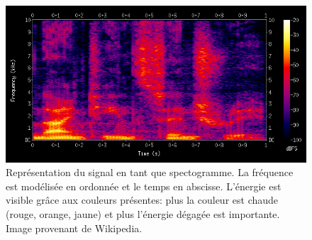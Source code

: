 \begin{figure}[h]
  \centering
  \includegraphics[width=12cm]{./Chapitre3/figures/spectrogramme.png}
  \caption{Représentation du signal en tant que spectogramme. La fréquence est modélisée en ordonnée et le temps en abscisse. L'énergie est visible grâce aux couleurs présentes: plus la couleur est chaude (rouge, orange, jaune) et plus l'énergie dégagée est importante. Image provenant de Wikipedia.}
  \label{fig:spectrogramme}
\end{figure}
